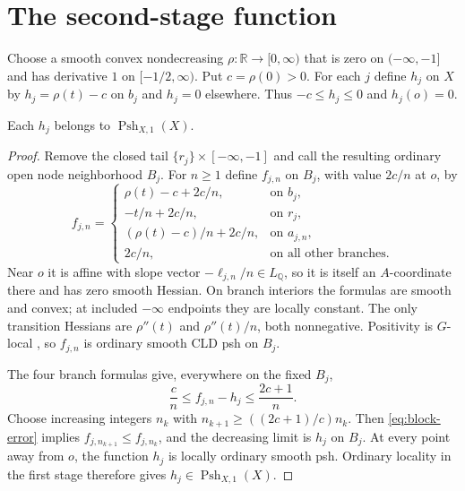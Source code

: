 \documentclass[11pt,a4paper]{amsart}
\begin{document}
\section{The second-stage function}\label{sec:construction}

Choose a smooth convex nondecreasing $\rho:\mathbb R\to[0,\infty)$ that is zero on $(-\infty,-1]$ and has derivative $1$ on $[-1/2,\infty)$. Put $c=\rho(0)>0$. For each $j$ define $h_j$ on $X$ by $h_j=\rho(t)-c$ on $b_j$ and $h_j=0$ elsewhere. Thus $-c\leq h_j\leq0$ and $h_j(o)=0$.

\begin{lemma}\label{lem:first-stage-blocks}
Each $h_j$ belongs to $\operatorname{Psh}_{X,1}(X)$.
\end{lemma}

\begin{proof}
Remove the closed tail $\{r_j\}\times[-\infty,-1]$ and call the resulting ordinary open node neighborhood $B_j$. For $n\geq1$ define $f_{j,n}$ on $B_j$, with value $2c/n$ at $o$, by
\[
 f_{j,n}=\begin{cases}
 \rho(t)-c+2c/n,&\text{on }b_j,\\
 -t/n+2c/n,&\text{on }r_j,\\
 (\rho(t)-c)/n+2c/n,&\text{on }a_{j,n},\\
 2c/n,&\text{on all other branches.}
 \end{cases}
\]
Near $o$ it is affine with slope vector $-\ell_{j,n}/n\in L_{\mathbb Q}$, so it is itself an $A$-coordinate there and has zero smooth Hessian. On branch interiors the formulas are smooth and convex; at included $-\infty$ endpoints they are locally constant. The only transition Hessians are $\rho''(t)$ and $\rho''(t)/n$, both nonnegative. Positivity is $G$-local \cite[Definition~3.5.1]{CLD12}, so $f_{j,n}$ is ordinary smooth CLD psh on $B_j$.

The four branch formulas give, everywhere on the fixed $B_j$,
\begin{equation}\label{eq:block-error}
 \frac cn\leq f_{j,n}-h_j\leq\frac{2c+1}{n}.
\end{equation}
Choose increasing integers $n_k$ with $n_{k+1}\geq((2c+1)/c)n_k$. Then \eqref{eq:block-error} implies $f_{j,n_{k+1}}\leq f_{j,n_k}$, and the decreasing limit is $h_j$ on $B_j$. At every point away from $o$, the function $h_j$ is locally ordinary smooth psh. Ordinary locality in the first stage therefore gives $h_j\in\operatorname{Psh}_{X,1}(X)$.
\end{proof}
\end{document}
